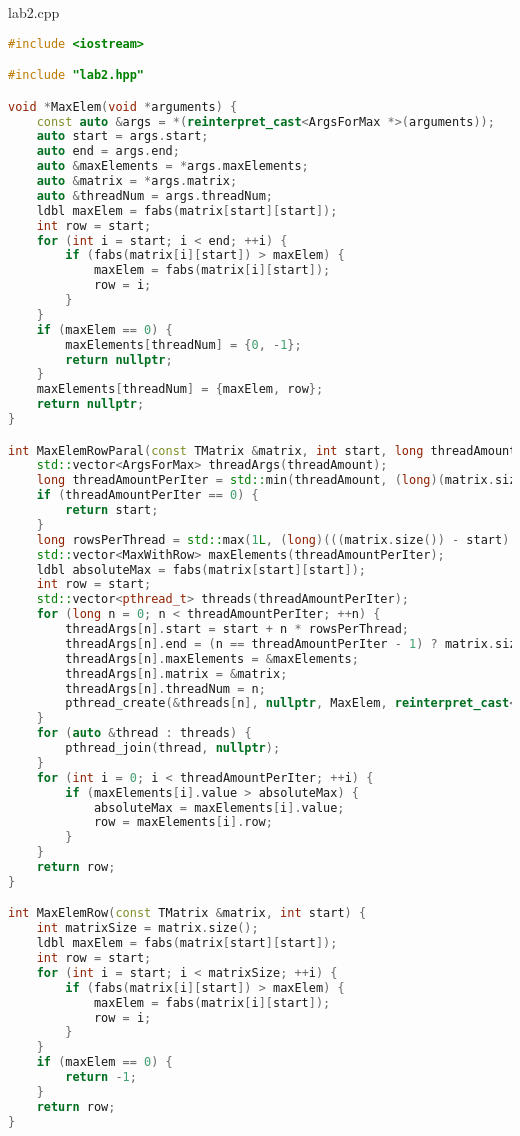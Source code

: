 \documentclass[a4paper, 12pt]{article}
\begin{document}
lab2.cpp
\begin{lstlisting}[language=C++]
#include <iostream>

#include "lab2.hpp"

void *MaxElem(void *arguments) {
    const auto &args = *(reinterpret_cast<ArgsForMax *>(arguments));
    auto start = args.start;
    auto end = args.end;
    auto &maxElements = *args.maxElements;
    auto &matrix = *args.matrix;
    auto &threadNum = args.threadNum;
    ldbl maxElem = fabs(matrix[start][start]);
    int row = start;
    for (int i = start; i < end; ++i) {
        if (fabs(matrix[i][start]) > maxElem) {
            maxElem = fabs(matrix[i][start]);
            row = i;
        }
    }
    if (maxElem == 0) {
        maxElements[threadNum] = {0, -1};
        return nullptr;
    }
    maxElements[threadNum] = {maxElem, row};
    return nullptr;
} 

int MaxElemRowParal(const TMatrix &matrix, int start, long threadAmount) {
    std::vector<ArgsForMax> threadArgs(threadAmount);
    long threadAmountPerIter = std::min(threadAmount, (long)(matrix.size() - start));
    if (threadAmountPerIter == 0) {
        return start;
    }
    long rowsPerThread = std::max(1L, (long)(((matrix.size()) - start) / threadAmountPerIter));
    std::vector<MaxWithRow> maxElements(threadAmountPerIter);
    ldbl absoluteMax = fabs(matrix[start][start]);
    int row = start;
    std::vector<pthread_t> threads(threadAmountPerIter);
    for (long n = 0; n < threadAmountPerIter; ++n) {   
        threadArgs[n].start = start + n * rowsPerThread;
        threadArgs[n].end = (n == threadAmountPerIter - 1) ? matrix.size() : (threadArgs[n].start + rowsPerThread);
        threadArgs[n].maxElements = &maxElements;
        threadArgs[n].matrix = &matrix;
        threadArgs[n].threadNum = n;
        pthread_create(&threads[n], nullptr, MaxElem, reinterpret_cast<void *>(&threadArgs[n]));
    }
    for (auto &thread : threads) {
        pthread_join(thread, nullptr);
    }
    for (int i = 0; i < threadAmountPerIter; ++i) {
        if (maxElements[i].value > absoluteMax) {
            absoluteMax = maxElements[i].value;
            row = maxElements[i].row;
        }
    }
    return row;
}

int MaxElemRow(const TMatrix &matrix, int start) {
    int matrixSize = matrix.size();
    ldbl maxElem = fabs(matrix[start][start]);
    int row = start;
    for (int i = start; i < matrixSize; ++i) {
        if (fabs(matrix[i][start]) > maxElem) {
            maxElem = fabs(matrix[i][start]);
            row = i;
        }
    }
    if (maxElem == 0) {
        return -1;
    }
    return row;
}


\end{lstlisting}
\end{document}

